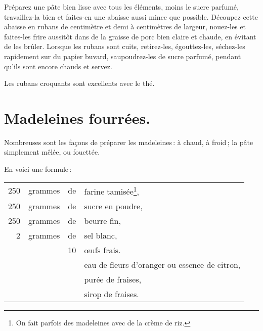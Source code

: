 Préparez une pâte bien lisse avec tous les éléments, moins le sucre parfumé,
travaillez-la bien et faites-en une abaisse aussi mince que possible. Découpez
cette abaisse en rubans de {\mmm} centimètre et demi à {\mmm}
centimètres de largeur, nouez-les et faites-les frire aussitôt dans de la
graisse de porc bien claire et chaude, en évitant de les brûler. Lorsque les
rubans sont cuits, retirez-les, égouttez-les, séchez-les rapidement sur du
papier buvard, saupoudrez-les de sucre parfumé, pendant qu'ils sont encore
chauds et servez.

\medskip

Les rubans croquants sont excellents avec le thé.

\section*{\centering Madeleines fourrées.}
{}

\sk

Nombreuses sont les façons de préparer les madeleines : à chaud, à froid ; la
pâte simplement mêlée, ou fouettée.

En voici une formule :

\footnotesize
\begin{longtable}{rrrp{16em}}
    250 & grammes & de & farine tamisée\footnote{On fait parfois des madeleines
                         avec de la crème de riz.},                                                       \\
    250 & grammes & de & sucre en poudre,                                                                 \\
    250 & grammes & de & beurre fin,                                                                      \\
      2 & grammes & de & sel blanc,                                                                       \\
        &         & 10 & œufs frais.                                                                      \\
        &         &    & eau de fleurs d'oranger ou essence de citron,                                    \\
        &         &    & purée de fraises,                                                                \\
        &         &    & sirop de fraises.                                                                \\
\end{longtable}
\normalsize

